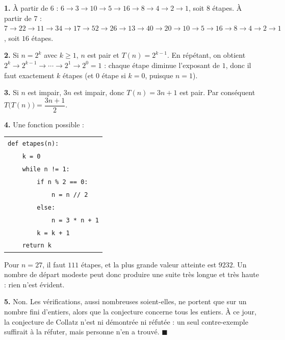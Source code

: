 \textbf{1.} À partir de $6$ :
$6 \to 3 \to 10 \to 5 \to 16 \to 8 \to 4 \to 2 \to 1$, soit $8$ étapes.
À partir de $7$ :
$7 \to 22 \to 11 \to 34 \to 17 \to 52 \to 26 \to 13 \to 40 \to 20 \to 10 \to 5
\to 16 \to 8 \to 4 \to 2 \to 1$, soit $16$ étapes.

\textbf{2.} Si $n = 2^k$ avec $k \geqslant 1$, $n$ est pair et $T(n) = 2^{k-1}$.
En répétant, on obtient $2^k \to 2^{k-1} \to \cdots \to 2^1 \to 2^0 = 1$ :
chaque étape diminue l'exposant de $1$, donc il faut exactement $k$ étapes
(et $0$ étape si $k = 0$, puisque $n = 1$).

\textbf{3.} Si $n$ est impair, $3n$ est impair, donc $T(n) = 3n + 1$ est pair.
Par conséquent $T\bigl(T(n)\bigr) = \dfrac{3n+1}{2}$.

\textbf{4.} Une fonction possible :
\begin{center}
\begin{tabular}{l}
\texttt{def etapes(n):} \\
\texttt{\ \ \ \ k = 0} \\
\texttt{\ \ \ \ while n != 1:} \\
\texttt{\ \ \ \ \ \ \ \ if n \% 2 == 0:} \\
\texttt{\ \ \ \ \ \ \ \ \ \ \ \ n = n // 2} \\
\texttt{\ \ \ \ \ \ \ \ else:} \\
\texttt{\ \ \ \ \ \ \ \ \ \ \ \ n = 3 * n + 1} \\
\texttt{\ \ \ \ \ \ \ \ k = k + 1} \\
\texttt{\ \ \ \ return k}
\end{tabular}
\end{center}
Pour $n = 27$, il faut $111$ étapes, et la plus grande valeur atteinte est
$9232$. Un nombre de départ modeste peut donc produire une suite très longue
et très haute : rien n'est évident.

\textbf{5.} Non. Les vérifications, aussi nombreuses soient-elles, ne
portent que sur un nombre fini d'entiers, alors que la conjecture concerne
tous les entiers. À ce jour, la conjecture de Collatz n'est ni démontrée ni
réfutée : un seul contre-exemple suffirait à la réfuter, mais personne n'en
a trouvé. \hfill $\blacksquare$

